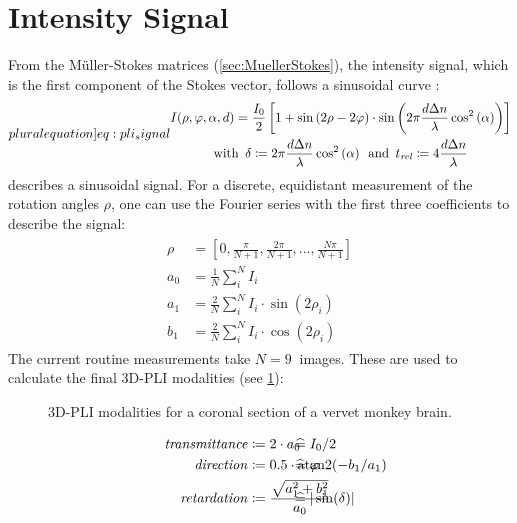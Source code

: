 \section{Intensity Signal}\label{sec::intSignal}
%
From the M{\"u}ller-Stokes matrices (\cref{sec:MuellerStokes}), the intensity signal, which is the first component of the Stokes vector, follows a sinusoidal curve \cite{MenzelMaster,MenzelDissertation}:
%
\begin{align}
\label[pluralequation]{eq:pli_signal}
\centering
\begin{gathered}
I(\rho, \varphi, \alpha, d) =\frac{I_0}{2}\left[ 1+ \sin\left(2\rho - 2\varphi \right)\cdot \sin \left( 2\pi\frac{d \dn}{\lambda} \cos^2\left( \alpha \right) \right) \right] \\
\text{with} \enspace \delta \coloneqq 2\pi\frac{d \dn}{\lambda} \cos^2\left( \alpha \right) \enspace
\text{and} \enspace \trel \coloneqq 4 \frac{d \dn}{\lambda}
\end{gathered}
\end{align}
%
 describes a sinusoidal signal.
For a discrete, equidistant measurement of the rotation angles $\rho$, one can use the Fourier series with the first three coefficients to describe the signal:
%
\begin{align}
\begin{split}
\rho &= \left[0, \frac{\pi}{N+1}, \frac{2\pi}{N+1}, ..., \frac{N\pi}{N+1}\right]\\
a_0 &= \frac{1}{N} \sum_i^N I_i\\
a_1 &= \frac{2}{N} \sum_i^N I_i \cdot \sin(2 \rho_i)\\
b_1 &= \frac{2}{N} \sum_i^N I_i \cdot \cos(2 \rho_i)
\end{split}
\end{align}
%
The current routine measurements take $N=\SI{9}{}$ images.
These are used to calculate the final \ac{3D-PLI} modalities (see \cref{fig:vervetpli}):
%
\begin{figure}[!t]

\caption[]{3D-PLI modalities for a coronal section of a vervet monkey brain.}
\label{fig:vervetpli}
\end{figure}
%
\begin{align}
\begin{split}
\mathit{transmittance} &\coloneqq 2 \cdot a_0 \vphantom{I_0/2} \\
\mathit{direction} &\coloneqq 0.5 \cdot \atantwo(-b_1 / a_1) \vphantom{\varphi} \\
\mathit{retardation} &\coloneqq \frac{\sqrt{a_1^2 + b_1^2}}{a_0}  \vphantom{\sin(\delta)}
\end{split}
\hspace{-7em}
\begin{split}
& \mathrel{\widehat{=}} I_0/2 \vphantom{2 \cdot a_0}\\
& \mathrel{\widehat{=}} \varphi \vphantom{0.5 \cdot \atantwo(-b_1 / a_1)} \\
& \mathrel{\widehat{=}} |\sin(\delta)| \vphantom{\frac{\sqrt{a_1^2 + b_1^2}}{a_0}}
\end{split}
\end{align}
